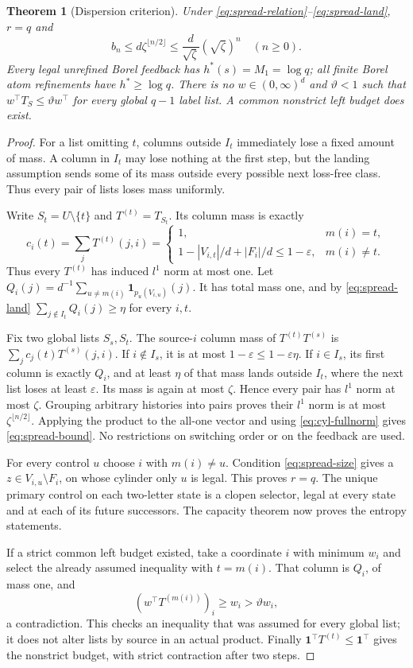 \documentclass[11pt,reqno]{amsart}
\numberwithin{equation}{section}
\newtheorem{theorem}{Theorem}[section]
\theoremstyle{definition}
\theoremstyle{definition}
\newcommand{\one}{\mathbf 1}
\newcommand{\eps}{\varepsilon}
\begin{document}
\begin{theorem}[Dispersion criterion]\label{thm:spread}
Under \eqref{eq:spread-relation}--\eqref{eq:spread-land}, $r=q$ and
\begin{equation}\label{eq:spread-bound}
 b_n\le d\zeta^{\lfloor n/2\rfloor}
 \le\frac d{\sqrt\zeta}(\sqrt\zeta)^n\quad(n\ge0).
\end{equation}
Every legal unrefined Borel feedback has $h^*(s)=M_1=\log q$;
all finite Borel atom refinements have $h^*\ge\log q$.
There is no $w\in(0,\infty)^d$ and $\vartheta<1$ such that
$w^\top T_S\le\vartheta w^\top$ for every global
$q-1$ label list. A common nonstrict left budget does exist.
\end{theorem}
\begin{proof}
For a list omitting $t$, columns outside $I_t$ immediately lose a
fixed amount of mass. A column in $I_t$ may lose nothing at the first
step, but the landing assumption sends some of its mass outside
every possible next loss-free class. Thus every pair of lists loses
mass uniformly.

Write $S_t=U\setminus\{t\}$ and $T^{(t)}=T_{S_t}$.
Its column mass is exactly
\[
 c_i(t)=\sum_jT^{(t)}(j,i)=
 \begin{cases}
 1,&m(i)=t,\\
 1-|V_{i,t}|/d+|F_i|/d\le1-\eps,&m(i)\ne t.
 \end{cases}
\]
Thus every $T^{(t)}$ has induced $l^1$ norm at most one.
Let $Q_i(j)=d^{-1}\sum_{u\ne m(i)}\one_{p_u(V_{i,u})}(j)$.
It has total mass one, and by \eqref{eq:spread-land}
$\sum_{j\notin I_t}Q_i(j)\ge\eta$ for every $i,t$.

Fix two global lists $S_s,S_t$. The source-$i$ column mass of
$T^{(t)}T^{(s)}$ is $\sum_jc_j(t)T^{(s)}(j,i)$.
If $i\notin I_s$, it is at most $1-\eps\le1-\eps\eta$.
If $i\in I_s$, its first column is exactly $Q_i$, and at least
$\eta$ of that mass lands outside $I_t$, where the next list loses
at least $\eps$. Its mass is again at most $\zeta$.
Hence every pair has $l^1$ norm at most $\zeta$.
Grouping arbitrary histories into pairs proves their $l^1$ norm
is at most $\zeta^{\lfloor n/2\rfloor}$. Applying the product
to the all-one vector and using \eqref{eq:cyl-fullnorm} gives
\eqref{eq:spread-bound}. No restrictions on switching order or
on the feedback are used.

For every control $u$ choose $i$ with $m(i)\ne u$. Condition
\eqref{eq:spread-size} gives a $z\in V_{i,u}\setminus F_i$,
on whose cylinder only $u$ is legal. This proves $r=q$.
The unique primary control on each two-letter state is a clopen
selector, legal at every state and at each of its future successors.
The capacity theorem now proves the entropy statements.

If a strict common left budget existed, take a coordinate $i$ with
minimum $w_i$ and select the already assumed inequality with
$t=m(i)$. That column is $Q_i$, of mass one, and
\[
 (w^\top T^{(m(i))})_i\ge w_i>
 \vartheta w_i,
\]
a contradiction. This checks an inequality that was assumed for
every global list; it does not alter lists by source in an actual
product. Finally $\one^\top T^{(t)}\le\one^\top$ gives the
nonstrict budget, with strict contraction after two steps.
\end{proof}
\end{document}
